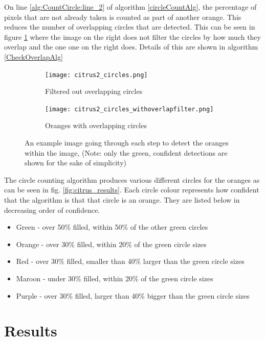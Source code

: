 \documentclass[conference]{IEEEtran}
\begin{document}
On line \ref{alg:CountCircle:line_2} of algorithm \ref{circleCountAlg}, the percentage of pixels that are not already taken is counted as part of another orange. This reduces the number of overlapping circles that are detected. This can be seen in figure \ref{overlapComp} where the image on the right does not filter the circles by how much they overlap and the one one on the right does. Details of this are shown in algorithm \ref{CheckOverlapAlg}


\begin{figure}[H]
  \begin{subfigure}{.49\linewidth}
 	 \texttt{[image: citrus2\_circles.png]}\hfill
	 \caption{Filtered out overlapping circles}
  \end{subfigure}
  \begin{subfigure}{.49\linewidth}
  	\texttt{[image: citrus2\_circles\_withoverlapfilter.png]}
   	\caption{Oranges with overlapping circles}
  \end{subfigure}
  \caption{An example image going through each step to detect the oranges within the image, (Note: only the green, confident detections are shown for the sake of simplicity)} \label{overlapComp}
\end{figure}


The circle counting algorithm produces various different circles for the oranges as can be seen in fig. \ref{fig:citrus_results}. Each circle colour represents how confident that the algorithm is that that circle is an orange. They are listed below in decreasing order of confidence.

\begin{itemize}
\item Green - over 50\% filled, within 50\% of the other green circles
\item Orange - over 30\% filled, within 20\% of the green circle sizes
\item Red - over 30\% filled, smaller than 40\% larger than the green circle sizes
\item Maroon - under 30\% filled,  within 20\% of the green circle sizes
\item Purple - over 30\% filled, larger  than 40\% bigger than the green circle sizes
\end{itemize}


\section{Results}
\end{document}
